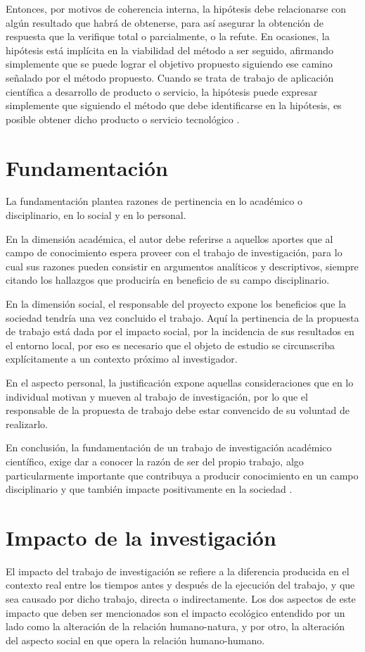 \documentclass[12pt,a4paper]{article}
\begin{document}
Entonces, por motivos de coherencia interna, la hipótesis debe relacionarse con algún resultado que habrá de obtenerse, para así asegurar la obtención de respuesta  que la verifique total o parcialmente, o la refute. En ocasiones, la hipótesis está implícita en la viabilidad del método a ser seguido, afirmando simplemente que se puede lograr el objetivo propuesto siguiendo ese camino señalado por el método propuesto. Cuando se trata de trabajo de aplicación científica a desarrollo de producto o servicio, la hipótesis puede expresar simplemente que siguiendo el método que debe identificarse en la hipótesis, es posible obtener dicho producto o servicio tecnológico \cite{dpuntode, escuela }. 

\section{Fundamentación}
La fundamentación plantea razones de pertinencia en lo académico o disciplinario, en lo social y en lo personal.

En la dimensión académica, el autor debe referirse a aquellos aportes que al campo de conocimiento espera proveer con el trabajo de investigación, para lo cual sus razones pueden consistir en argumentos analíticos y descriptivos, siempre citando los hallazgos que produciría en beneficio de su campo disciplinario.

En la dimensión social, el responsable del proyecto expone los beneficios que la sociedad tendría una vez concluido el trabajo. Aquí la pertinencia de la propuesta de trabajo está dada por el impacto social, por la incidencia de sus resultados en el entorno local, por eso es necesario que el objeto de estudio se circunscriba explícitamente a un contexto próximo al investigador.

En el aspecto personal, la justificación expone aquellas consideraciones que en lo individual motivan y mueven al trabajo de investigación, por lo que el responsable de la propuesta de trabajo debe estar convencido de su voluntad de realizarlo.

En conclusión, la fundamentación de un trabajo de investigación académico científico, exige dar a conocer la razón de ser del propio trabajo, algo particularmente importante que contribuya a producir conocimiento en un campo disciplinario y que también impacte positivamente en la sociedad \cite{aguirre}.

\section{Impacto de la investigación}
El impacto del trabajo de investigación se refiere a la diferencia producida en el contexto real entre los tiempos antes y después de la ejecución del trabajo, y que sea causado por dicho trabajo, directa o indirectamente. Los dos aspectos de este impacto que deben ser mencionados son el impacto ecológico entendido por un lado como la alteración de la relación humano-natura, y por otro, la alteración del aspecto social en que opera la relación humano-humano. 
\end{document}
